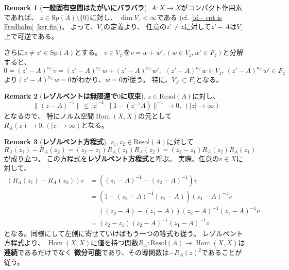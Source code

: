 \documentclass[uplatex]{jsarticle}
\theoremstyle{definition}
\newtheorem{rem}[rem]{Remark}
\DeclareMathOperator{\Hom}{Hom}
\newcommand{\resol}{\mathrm{Resol}}
\newcommand{\spectm}{\mathrm{Sp}}
\begin{document}
\begin{rem}[\textbf{一般固有空間はたがいにバラバラ}]
  \(A:X\to X\)がコンパクト作用素であれば、
  \(z\in \spectm(A)\setminus \{0\}\)に対し、
  \(\dim V_z < \infty\)である
  (cf. \autoref{id - cpt is Fredholm} \ref{ker fin})。
  よって、\(V_z\)の定義より、
  任意の\(z'\neq z\)に対して\(z'-A\)は\(V_z\)上で可逆である。

  さらに\(z\neq z'\in \spectm(A)\)とする。
  \(v\in V_{z'}\)を\(v = w + w', (w\in V_z, w'\in F_z)\)と分解すると、
  \[
  0 = (z'-A)^{n_{z'}}v = (z'-A)^{n_{z'}}w + (z'-A)^{n_{z'}}w', \ \
  (z'-A)^{n_{z'}}w \in V_z, \ (z'-A)^{n_{z'}}w'\in F_z
  \]
  より\((z'-A)^{n_{z'}}w = 0\)がわかり、\(w=0\)が従う。
  特に、\(V_{z'}\subset F_z\)となる。
\end{rem}



\begin{rem}[\textbf{レゾルベントは無限遠で\(0\)に収束}]
  \label{resol infty 0}
  \(z\in \resol(A)\)に対し、
  \[\|(z-A)^{-1}\| \leq |z|^{-1}\cdot \|1-(z^{-1}A)\|^{-1} \to 0, \ (|z| \to \infty)\]
  となるので、
  特にノルム空間\(\Hom(X,X)\)の元として
  \(R_A(z) \to 0, (|z|\to \infty)\)となる。
\end{rem}



\begin{rem}[\textbf{レゾルベント方程式}]
  \label{rem: resol eq}
  \(z_1,z_2\in \resol(A)\)に対して
  \[
  R_A(z_1)-R_A(z_2) = (z_2-z_1)R_A(z_1)R_A(z_2) = (z_2-z_1)R_A(z_2)R_A(z_1)
  \]
  が成り立つ。
  この方程式を\textbf{レゾルベント方程式}と呼ぶ。
  実際、任意の\(v\in X\)に対して、
  \begin{align*}
    (R_A(z_1)-R_A(z_2))v &= ((z_1-A)^{-1} - (z_2-A)^{-1})v \\
    &= (1 - (z_2-A)^{-1}(z_1-A))(z_1-A)^{-1}v \\
    &= ((z_2-A) - (z_1-A))(z_2-A)^{-1}(z_1-A)^{-1}v \\
    &= (z_2-z_1)(z_2-A)^{-1}(z_1-A)^{-1}v
  \end{align*}
  となる。同様にして左側に寄せていけばもう一つの等式も従う。
  レゾルベント方程式より、
  \(\Hom(X,X)\)に値を持つ関数\(R_A:\resol(A)\to \Hom(X,X)\)は\textbf{連続}であるだけでなく
  \textbf{微分可能}であり、その導関数は\(-R_A(z)^2\)であることが従う。
\end{rem}
\end{document}
